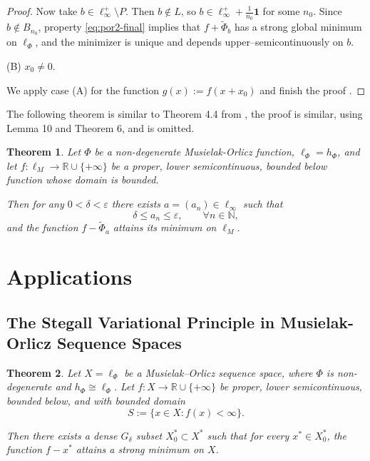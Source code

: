\documentclass[12pt]{article}
\theoremstyle{thmstyleone}%
\newtheorem{theorem}{Theorem}
\theoremstyle{thmstyletwo}%
\theoremstyle{thmstylethree}%
\begin{document}
{{{{\begin{proof}
Now take $b\in\ell_\infty^+\setminus P$.  
Then $b\notin L$, so $b\in \ell_\infty^+ + \frac{1}{n_0}\mathbf{1}$ for some
$n_0$.  
Since $b\notin B_{n_0}$, property \eqref{eq:por2-final} implies that
$f+\widetilde{\Phi}_b$ has a strong global minimum on $\ell_\Phi$, and the
minimizer is unique and depends upper--semicontinuously on $b$.
 
(B) $x_0\neq 0$.

We apply case (A) for the function $g(x):=f(x+x_0)$ and finish the proof .
\end{proof}

 
The following theorem is similar to Theorem 4.4 from \cite{Topalova-Zlateva},  the proof is similar, using Lemma 10 and Theorem 6, and is omitted. 

\begin{theorem}\label{theorem 17}
Let $\Phi$ be a non-degenerate Musielak-Orlicz function, $\ell_\Phi=h_\Phi$, and let 
\(f:\ell_M \to \mathbb{R}\cup\{+\infty\}\) be a proper, lower semicontinuous, bounded below function whose domain is bounded.

Then for any \(0<\delta<\varepsilon\) there exists \(a=(a_n)\in \ell_\infty\) such that
\begin{equation}\label{eq:a-bounds}
\delta \le a_n \le \varepsilon,\qquad \forall n\in\mathbb{N},
\end{equation}
and the function \(f-\widetilde \Phi_a\) attains its minimum on \(\ell_M\).
\end{theorem}
} 
}   }
 
\section {Applications}

\subsection {The Stegall Variational Principle in Musielak-Orlicz Sequence Spaces}

 
\begin{theorem}\label{thm:generic-strong-min}
Let $X=\ell_{\Phi}$ be a Musielak--Orlicz sequence space, where $\Phi$ is non-degenerate and 
$h_{\Phi}\cong \ell_{\Phi}$. 
 Let $f:X\to\mathbb{R}\cup\{+\infty\}$ be proper, lower semicontinuous, bounded below, and with bounded domain
\[
S:=\{x\in X : f(x)<\infty\}.
\]


Then there exists a dense $G_\delta$ subset $X_0^*\subset X^*$ such that for every $x^*\in X_0^*$, 
the function $f-x^*$ attains a strong minimum on $X$.
\end{theorem}

}
\end{document}
